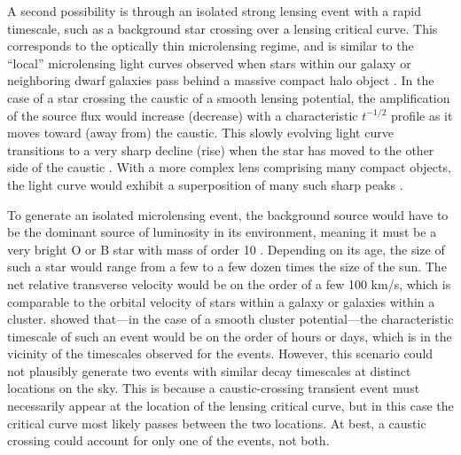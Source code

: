 A second possibility is through an isolated strong lensing event with
a rapid timescale, such as a background star crossing over a lensing
critical curve.  This corresponds to the optically thin microlensing
regime, and is similar to the ``local'' microlensing light curves
observed when stars within our galaxy or neighboring dwarf galaxies
pass behind a massive compact halo object \citep{Paczynski:1986,
  Alcock:1993, Aubourg:1993, Udalski:1993}.  In the case of a star
crossing the caustic of a smooth lensing potential, the amplification
of the source flux would increase (decrease) with a characteristic
$t^{-1/2}$ profile as it moves toward (away from) the caustic. This
slowly evolving light curve transitions to a very sharp decline (rise)
when the star has moved to the other side of the caustic
\citep{Schneider:1986,MiraldaEscude:1991}.  With a more complex lens
comprising many compact objects, the light curve would exhibit a
superposition of many such sharp peaks \citep{Lewis:1993}.

To generate an isolated microlensing event, the background source
would have to be the dominant source of luminosity in its environment,
meaning it must be a very bright O or B star with mass of order 10
\Msun.  Depending on its age, the size of such a star would range from
a few to a few dozen times the size of the sun.  The net relative
transverse velocity would be on the order of a few 100 km/s, which is
comparable to the orbital velocity of stars within a galaxy or
galaxies within a cluster.  \citet{MiraldaEscude:1991} showed
that---in the case of a smooth cluster potential---the
%
%
%
characteristic timescale of such an event would be on the order of
hours or days, which is in the vicinity of the timescales observed for
the \spock events.  However, this scenario could not plausibly
generate two events with similar decay timescales at distinct
locations on the sky.  This is because a caustic-crossing transient
event must necessarily appear at the location of the lensing critical
curve, but in this case the critical curve most likely passes between
the two \spock locations. At best, a caustic crossing could account
for only one of the \spock events, not both.


